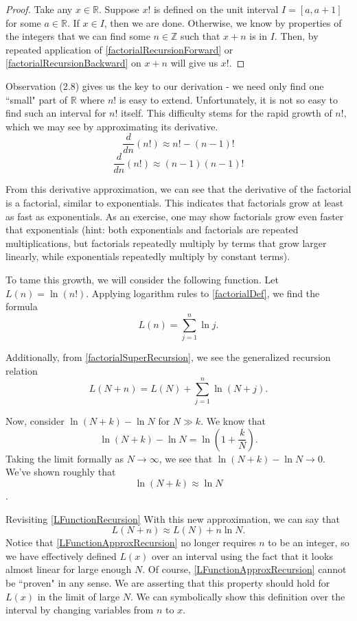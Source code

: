 \begin{proof}
Take any $x \in \mathbb{R}$. 
Suppose $x!$ is defined on the unit interval $I = [a,a + 1]$ for some $a \in \mathbb{R}$.
If $x \in I$, then we are done.
Otherwise, we know by properties of the integers that we can find some $n \in \mathbb{Z}$ such that $x + n$ is in $I$. 
Then, by repeated application of \eqref{factorialRecursionForward} or \eqref{factorialRecursionBackward} on $x + n$ will give us $x!$. 
\end{proof}

Observation (2.8) gives us the key to our derivation - we need only find one ``small" part of $\mathbb{R}$ where $n!$ is easy to extend.
Unfortunately, it is not so easy to find such an interval for $n!$ itself.
This difficulty stems for the rapid growth of $n!,$ which we may see by approximating its derivative.
$$\frac{d}{dn} (n!) \approx n! - (n-1)!$$
$$\frac{d}{dn} (n!) \approx (n-1) (n-1)!$$

From this derivative approximation, we can see that the derivative of the factorial is a factorial, similar to exponentials.
This indicates that factorials grow at least as fast as exponentials. 
As an exercise, one may show factorials grow even faster that exponentials (hint: both exponentials and factorials are repeated multiplications, but factorials repeatedly multiply by terms that grow larger linearly, while exponentials repeatedly multiply by constant terms).

To tame this growth, we will consider the following function.
Let $L(n) = \ln (n!)$. 
Applying logarithm rules to \eqref{factorialDef}, we find the formula
\begin{equation}\label{LFunction}
L(n) = \sum_{j=1}^n \ln j.
\end{equation}

Additionally, from \eqref{factorialSuperRecursion}, we see the generalized recursion relation 
\begin{equation}\label{LFunctionRecursion}
L(N + n) = L(N) + \sum_{j=1}^n \ln(N+j).
\end{equation}

Now, consider $\ln (N + k) - \ln N$ for $N \gg k$. 
We know that
$$\ln (N + k) - \ln N = \ln\left(1 + \frac{k}{N}\right).$$
Taking the limit formally as $N \rightarrow \infty$, we see that $\ln (N+k) - \ln N \rightarrow 0$.
We've shown roughly that $$\ln (N+k) \approx \ln N$$.

Revisiting \eqref{LFunctionRecursion} With this new approximation, we can say that
\begin{equation}\label{LFunctionApproxRecursion}
L(N+n) \approx L(N) + n \ln N.
\end{equation}
Notice that \eqref{LFunctionApproxRecursion} no longer requires $n$ to be an integer, so we have effectively defined $L(x)$ over an interval using the fact that it looks almost linear for large enough $N$.
Of course, \eqref{LFunctionApproxRecursion} cannot be ``proven" in any sense.
We are asserting that this property should hold for $L(x)$ in the limit of large $N$.
We can symbolically show this definition over the interval by changing variables from $n$ to $x$.

